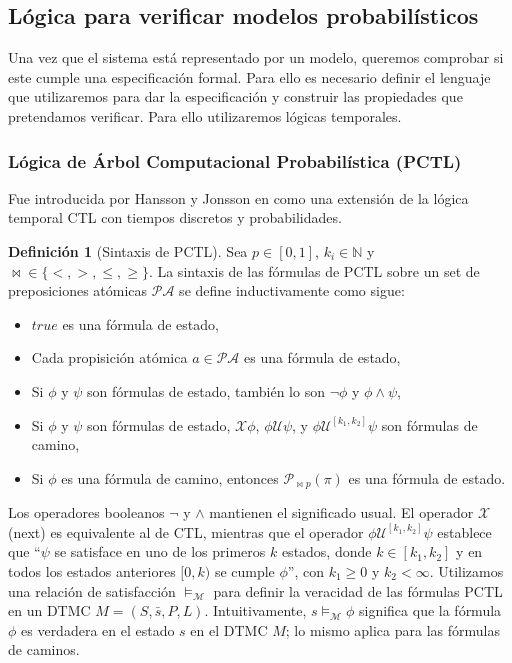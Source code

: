 \documentclass{article}
\begin{document}
\subsection{Lógica para verificar modelos probabilísticos}

Una vez que el sistema está representado por un modelo, queremos comprobar si este cumple una especificación formal. Para ello es necesario definir el lenguaje que utilizaremos para dar la especificación y construir las propiedades que pretendamos verificar. Para ello utilizaremos lógicas temporales.

\subsubsection{Lógica de Árbol Computacional Probabilística (PCTL)}

Fue introducida por Hansson y Jonsson en \cite{HH94} como una extensión de la lógica temporal CTL con tiempos discretos y probabilidades. \par

\textbf{Definición 1} (Sintaxis de PCTL). Sea $p\in[0,1]$, $k_i\in\mathbb{N}$ y $\bowtie\in\{<,>,\le,\ge\}$. La sintaxis de las fórmulas de PCTL sobre un set de preposiciones atómicas $\mathcal{PA}$ se define inductivamente como sigue:
\begin{itemize}
    \item $true$ es una fórmula de estado,
    \item Cada propisición atómica $a\in\mathcal{PA}$ es una fórmula de estado,
    \item Si $\phi$ y $\psi$ son fórmulas de estado, también lo son $\neg\phi$ y $\phi\land\psi$,
    \item Si $\phi$ y $\psi$ son fórmulas de estado, $\mathcal{X}\phi$, $\phi\mathcal{U}\psi$, y $\phi\mathcal{U}^{[k_1,k_2]}\psi$ son fórmulas de camino,
    \item Si $\phi$ es una fórmula de camino, entonces $\mathcal{P}_{\bowtie p}(\pi)$ es una fórmula de estado.
\end{itemize}\par

Los operadores booleanos $\neg$ y $\land$ mantienen el significado usual. El operador $\mathcal{X}$ (next) es equivalente al de CTL, mientras que el operador $\phi \mathcal{U}^{[k_1,k_2]} \psi$ establece que “$\psi$ se satisface en uno de los primeros $k$ estados, donde $k \in [k_1, k_2]$ y en todos los estados anteriores $[0, k)$ se cumple $\phi$”, con $k_1 \geq 0$ y $k_2 < \infty$.
Utilizamos una relación de satisfacción $\models_\mathcal{M}$ para definir la veracidad de las fórmulas PCTL en un DTMC $M = (S, \bar{s}, P, L)$. Intuitivamente, $s\models_\mathcal{M}\phi$ significa que la fórmula $\phi$ es verdadera en el estado $s$ en el DTMC $M$; lo mismo aplica para las fórmulas de caminos.\\
\end{document}
